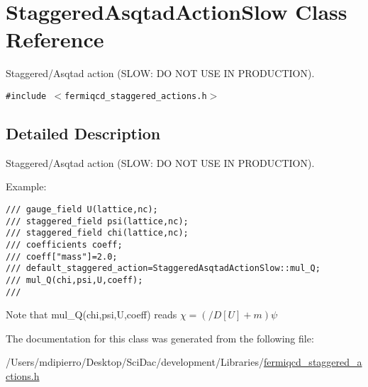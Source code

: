 \hypertarget{class_staggered_asqtad_action_slow}{
\section{StaggeredAsqtadActionSlow Class Reference}
\label{class_staggered_asqtad_action_slow}
}
Staggered/Asqtad action (SLOW: DO NOT USE IN PRODUCTION).  


{\tt \#include $<$fermiqcd\_\-staggered\_\-actions.h$>$}



\subsection{Detailed Description}
Staggered/Asqtad action (SLOW: DO NOT USE IN PRODUCTION). 

Example: 

\footnotesize\begin{verbatim}
/// gauge_field U(lattice,nc);
/// staggered_field psi(lattice,nc);
/// staggered_field chi(lattice,nc);
/// coefficients coeff;
/// coeff["mass"]=2.0;
/// default_staggered_action=StaggeredAsqtadActionSlow::mul_Q;
/// mul_Q(chi,psi,U,coeff);
/// \end{verbatim}
\normalsize
 Note that mul\_\-Q(chi,psi,U,coeff) reads $ \chi=(/\!\!\!D[U]+m)\psi $ 

The documentation for this class was generated from the following file:\begin{CompactItemize}
\item 
/Users/mdipierro/Desktop/SciDac/development/Libraries/\hyperlink{fermiqcd__staggered__actions_8h}{fermiqcd\_\-staggered\_\-actions.h}\end{CompactItemize}
